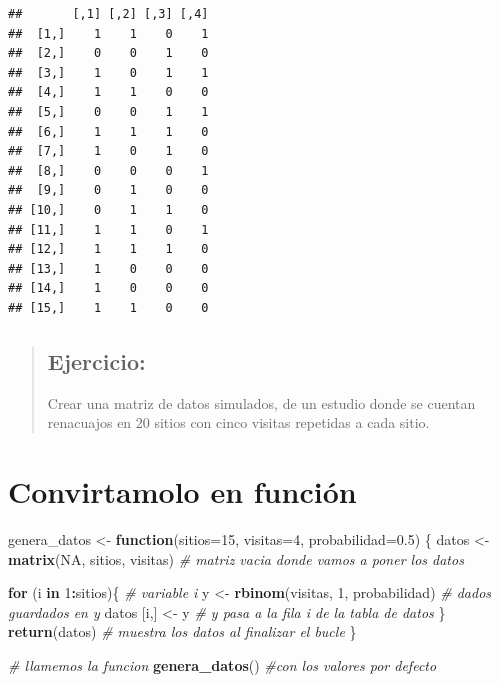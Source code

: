 \documentclass[
]{book}
\newenvironment{Shaded}{\begin{snugshade}}{\end{snugshade}}
\newcommand{\CommentTok}[1]{\textcolor[rgb]{0.56,0.35,0.01}{\textit{#1}}}
\newcommand{\ControlFlowTok}[1]{\textcolor[rgb]{0.13,0.29,0.53}{\textbf{#1}}}
\newcommand{\DataTypeTok}[1]{\textcolor[rgb]{0.13,0.29,0.53}{#1}}
\newcommand{\DecValTok}[1]{\textcolor[rgb]{0.00,0.00,0.81}{#1}}
\newcommand{\FloatTok}[1]{\textcolor[rgb]{0.00,0.00,0.81}{#1}}
\newcommand{\KeywordTok}[1]{\textcolor[rgb]{0.13,0.29,0.53}{\textbf{#1}}}
\newcommand{\NormalTok}[1]{#1}
\newcommand{\OperatorTok}[1]{\textcolor[rgb]{0.81,0.36,0.00}{\textbf{#1}}}
\newcommand{\OtherTok}[1]{\textcolor[rgb]{0.56,0.35,0.01}{#1}}
\newcommand{\StringTok}[1]{\textcolor[rgb]{0.31,0.60,0.02}{#1}}
\begin{document}
\begin{verbatim}
##       [,1] [,2] [,3] [,4]
##  [1,]    1    1    0    1
##  [2,]    0    0    1    0
##  [3,]    1    0    1    1
##  [4,]    1    1    0    0
##  [5,]    0    0    1    1
##  [6,]    1    1    1    0
##  [7,]    1    0    1    0
##  [8,]    0    0    0    1
##  [9,]    0    1    0    0
## [10,]    0    1    1    0
## [11,]    1    1    0    1
## [12,]    1    1    1    0
## [13,]    1    0    0    0
## [14,]    1    0    0    0
## [15,]    1    1    0    0
\end{verbatim}

\begin{quote}
\hypertarget{ejercicio-1}{%
\subsection{Ejercicio:}\label{ejercicio-1}}

Crear una matriz de datos simulados, de un estudio donde se cuentan renacuajos en 20 sitios con cinco visitas repetidas a cada sitio.
\end{quote}

\hypertarget{convirtamolo-en-funciuxf3n}{%
\section{Convirtamolo en función}\label{convirtamolo-en-funciuxf3n}}

\begin{Shaded}
\begin{Highlighting}[]
\NormalTok{genera_datos <-}\StringTok{ }\ControlFlowTok{function}\NormalTok{(}\DataTypeTok{sitios=}\DecValTok{15}\NormalTok{, }\DataTypeTok{visitas=}\DecValTok{4}\NormalTok{, }\DataTypeTok{probabilidad=}\FloatTok{0.5}\NormalTok{) \{}
\NormalTok{  datos <-}\StringTok{ }\KeywordTok{matrix}\NormalTok{(}\OtherTok{NA}\NormalTok{, sitios, visitas) }\CommentTok{# matriz vacia donde vamos a poner los datos}
  
  \ControlFlowTok{for}\NormalTok{ (i }\ControlFlowTok{in} \DecValTok{1}\OperatorTok{:}\NormalTok{sitios)\{     }\CommentTok{# variable i }
\NormalTok{    y <-}\StringTok{ }\KeywordTok{rbinom}\NormalTok{(visitas, }\DecValTok{1}\NormalTok{, probabilidad) }\CommentTok{# dados guardados en y}
\NormalTok{    datos [i,] <-}\StringTok{ }\NormalTok{y       }\CommentTok{# y pasa a la fila i de la tabla de datos}
\NormalTok{  \}  }
  \KeywordTok{return}\NormalTok{(datos) }\CommentTok{# muestra los datos al finalizar el bucle}
\NormalTok{\}                  }


\CommentTok{# llamemos la funcion }
\KeywordTok{genera_datos}\NormalTok{() }\CommentTok{#con los valores por defecto}
\end{Highlighting}
\end{Shaded}
\end{document}
